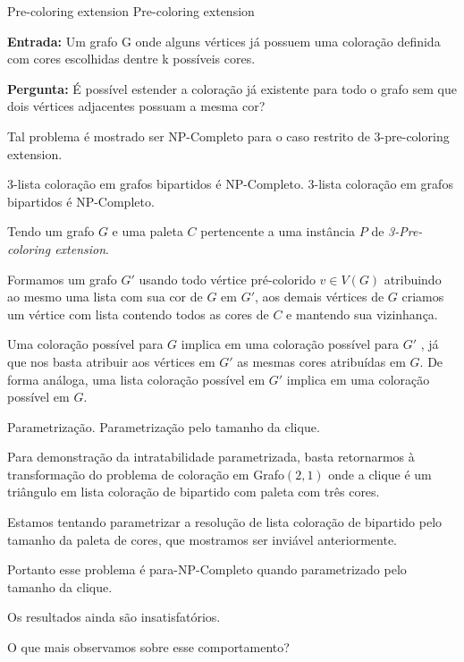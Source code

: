 \documentclass[9pt, compress]{beamer}
\newcommand{\?}{\textcolor{warn}{\textit{?}}}
\begin{document}
     \begin{frame}{Pre-coloring extension}
      \large{Pre-coloring extension}
      \normalsize\newline\newline
      
	      \textbf{Entrada:}  Um grafo G onde alguns vértices já possuem uma coloração definida com cores escolhidas dentre k possíveis cores.
	      
	      \textbf{Pergunta:}  É possível estender a coloração já existente para todo o grafo sem que dois vértices adjacentes possuam a mesma cor?
	      
	      Tal problema é mostrado ser NP-Completo para o caso restrito de 3-pre-coloring extension.
     \end{frame}
     
     \begin{frame}{3-lista coloração em grafos bipartidos é NP-Completo.}
    \large{3-lista coloração em grafos bipartidos é NP-Completo.}
      \normalsize\newline\newline
            
      Tendo um grafo $G$ e uma paleta $C$ pertencente a uma instância $P$ de \emph{3-Pre-coloring extension}.
      
      Formamos um grafo $G'$ usando todo vértice pré-colorido $v \in V(G)$ atribuindo ao mesmo uma lista com sua cor de $G$ em $G'$, aos demais vértices de $G$ criamos um vértice com lista contendo todos as cores de $C$ e mantendo sua vizinhança.
      
      Uma coloração possível para $G$ implica em uma coloração possível para $G'$ , já que nos basta atribuir aos vértices em $G'$ as mesmas cores atribuídas em $G$. De forma análoga, uma lista coloração possível em $G'$ implica em uma coloração possível em $G$.
      
      
     \end{frame}
     \begin{frame}{Parametrização.}
    \large{Parametrização pelo tamanho da clique.}
      \normalsize\newline\newline
            
      Para demonstração da intratabilidade parametrizada, basta retornarmos à transformação do problema de coloração em Grafo$(2,1)$ onde a clique é um triângulo em lista coloração de bipartido com paleta com três cores.
      
      Estamos tentando parametrizar a resolução de lista coloração de bipartido pelo tamanho da paleta de cores, que mostramos ser inviável anteriormente.
      
      Portanto esse problema é para-NP-Completo quando parametrizado pelo tamanho da clique.
      
     \end{frame}
     \begin{frame}[standout]
       Os resultados ainda são insatisfatórios.
       
       O que mais observamos sobre esse comportamento?
     \end{frame}
     
\end{document}
